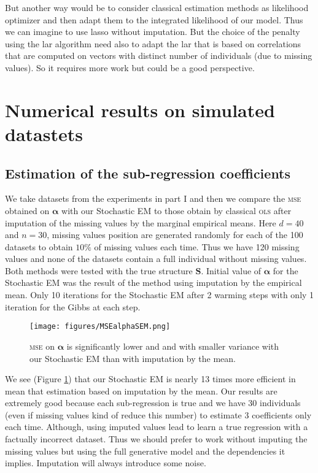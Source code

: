 \documentclass[12pt,a4paper]{report}
\begin{document}
		
		But another way would be to consider classical estimation methods as likelihood optimizer and then adapt them to the integrated likelihood of our model. Thus we can imagine to use {\sc lasso} without imputation. But the choice of the penalty using the {\sc lar} algorithm need also to adapt the {\sc lar} that is based on correlations that are computed on vectors with distinct number of individuals (due to missing values). So it requires more work but could be a good perspective.
	\section{Numerical results on simulated datastets}
		\subsection{Estimation of the sub-regression coefficients}
			We take datasets from the experiments in part I and then we compare the \textsc{mse} obtained on $\boldsymbol{\alpha}$ with our Stochastic EM to those obtain by classical \textsc{ols} after imputation of the missing values by the marginal empirical means. Here $d=40$ and $n=30$, missing values position are generated randomly for each of the 100 datasets to obtain $10 \%$ of missing values each time. Thus we have 120 missing values and none of the datasets contain a full individual without missing values.
Both methods were tested with the true structure $\boldsymbol{S}$. Initial value of $\boldsymbol{\alpha}$ for the Stochastic EM was the result of the method using imputation by the empirical mean. Only 10 iterations for the Stochastic EM after 2 warming steps with only 1 iteration for the Gibbs at each step.

\begin{figure}[h!]
	\centering
	\texttt{[image: figures/MSEalphaSEM.png]} 
	\caption{\textsc{mse} on $\boldsymbol{\alpha}$ is significantly lower and and with smaller variance with our Stochastic EM than with imputation by the mean.}\label{MSEalphaSEM}
\end{figure}

	We see (Figure \ref{MSEalphaSEM}) that our Stochastic EM is nearly 13 times more efficient in mean that estimation based on imputation by the mean. Our results are extremely good because each sub-regression is true and we have 30 individuals (even if missing values kind of reduce this number) to estimate 3 coefficients only each time. Although, using imputed values lead to learn a true regression with a factually incorrect dataset. Thus we should prefer to work without imputing the missing values but using the full generative model and the dependencies it implies. Imputation will always introduce some noise.
\end{document}

